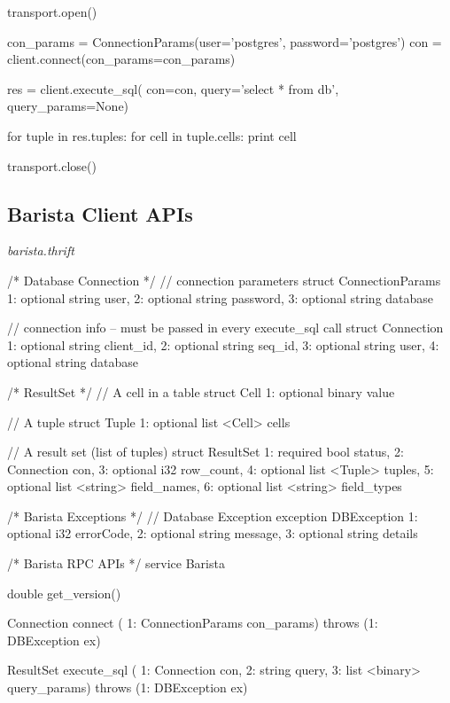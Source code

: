 \documentclass[a4paper]{article}
\begin{document}
\begin{multicols}{2}
{{\begin{spverbatim}
transport.open()

con_params = ConnectionParams(user='postgres', password='postgres')
con = client.connect(con_params=con_params)

res  = client.execute_sql(
  con=con,
  query='select * from db',
  query_params=None)

for tuple in res.tuples:
  for cell in tuple.cells:
    print cell

transport.close()
\end{spverbatim}
}
}
\subsection{Barista Client APIs}
\emph{barista.thrift}
\tiny{
\begin{spverbatim}
/* Database Connection */
// connection parameters
struct ConnectionParams {
  1: optional string user,
  2: optional string password,
  3: optional string database
}

// connection info -- must be passed in every execute_sql call
struct Connection {
  1: optional string client_id,
  2: optional string seq_id,
  3: optional string user,
  4: optional string database
}


/* ResultSet */
// A cell in a table
struct Cell {
  1: optional binary value
}

// A tuple
struct Tuple {
  1: optional list <Cell> cells
}

// A result set (list of tuples)
struct ResultSet {
  1: required bool status,
  2: Connection con,
  3: optional i32 row_count,
  4: optional list <Tuple> tuples,
  5: optional list <string> field_names,
  6: optional list <string> field_types
}


/* Barista Exceptions */
// Database Exception
exception DBException {
  1: optional i32 errorCode,
  2: optional string message,
  3: optional string details
}


/* Barista RPC APIs */
service Barista {
  double get_version()

  Connection connect (
     1: ConnectionParams con_params) throws (1: DBException ex)

  ResultSet execute_sql (
     1: Connection con,
     2: string query,
     3: list <binary> query_params) throws (1: DBException ex)
}
\end{spverbatim}
}
\end{multicols}
\end{document}
